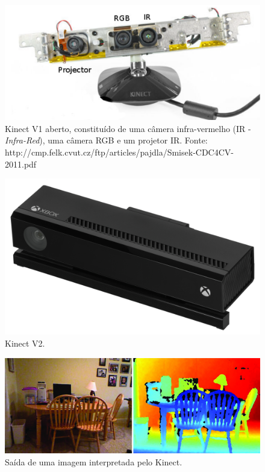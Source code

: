 \documentclass[table, usenames, svgnames, xcolor=dvipsnames]{beamer}
\begin{document}
\begin{frame}
	\begin{figure}
		\centering
		\includegraphics[width=0.5\linewidth]{figs/kinect.png}
		\caption{%
 		 Kinect V1 aberto, constituído de uma câmera infra-vermelho (IR -
 		 \protect\emph{Infra-Red}), uma câmera RGB e um projetor IR.
 		 \tiny{Fonte: http://cmp.felk.cvut.cz/ftp/articles/pajdla/Smisek-CDC4CV-2011.pdf}
		}
	\end{figure}
\end{frame}

\begin{frame}
	\begin{figure}
		\centering
		\includegraphics[width=0.5\linewidth]{figs/Xbox-One-Kinect.jpg}
		\caption{%
 		 Kinect V2.
		}
	\end{figure}
\end{frame}

\begin{frame}
	\begin{figure}
		\centering
		\includegraphics[width=1\linewidth]{figs/profundidadekinect.png}
		\caption{%
 			 Saída de uma imagem interpretada pelo Kinect.
		}
	\end{figure}
\end{frame}
\end{document}
